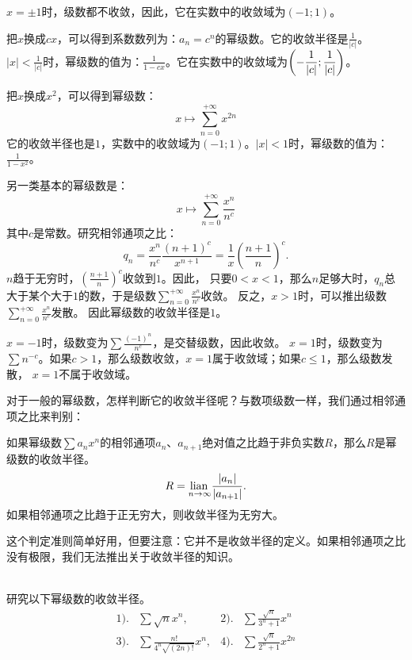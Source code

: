 \documentclass[12pt,UTF8,fontset=none]{ctexbook}
\begin{document}
$x = \pm 1$时，级数都不收敛，因此，它在实数中的收敛域为$(-1;1)$。

把$x$换成$cx$，可以得到系数数列为：$a_n = c^n$的幂级数。它的收敛半径是$\frac{1}{|c|}$。
$|x|<\frac{1}{|c|}$时，幂级数的值为：$\frac{1}{1 - cx}$。它在实数中的收敛域为$\displaystyle\left(-\frac{1}{|c|};\frac{1}{|c|}\right)$。

把$x$换成$x^2$，可以得到幂级数：
$$ x \mapsto \sum_{n=0}^{+\infty} x^{2n} $$
它的收敛半径也是$1$，实数中的收敛域为$(-1;1)$。$|x|<1$时，幂级数的值为：$\frac{1}{1 - x^2}$。

另一类基本的幂级数是：
$$ x \mapsto \sum_{n=0}^{+\infty} \frac{x^n}{n^c}$$
其中$c$是常数。研究相邻通项之比：
$$ q_n = \frac{x^n}{n^c} \frac{(n+1)^c}{x^{n+1}} = \frac{1}{x} \left(\frac{n+1}{n}\right)^c. $$
$n$趋于无穷时，$\displaystyle \left(\frac{n+1}{n}\right)^c$收敛到$1$。因此，
只要$0<x<1$，那么$n$足够大时，$q_n$总大于某个大于$1$的数，于是级数$\sum_{n=0}^{+\infty} \frac{x^n}{n^c}$收敛。
反之，$x>1$时，可以推出级数$\sum_{n=0}^{+\infty} \frac{x^n}{n^c}$发散。
因此幂级数的收敛半径是$1$。

$x=-1$时，级数变为$\sum \frac{(-1)^n}{n^c}$，是交替级数，因此收敛。
$x=1$时，级数变为$\sum n^{-c}$。如果$c>1$，那么级数收敛，$x=1$属于收敛域；如果$c\leqslant 1$，那么级数发散，
$x=1$不属于收敛域。

对于一般的幂级数，怎样判断它的收敛半径呢？与数项级数一样，我们通过相邻通项之比来判别：

\begin{tm}
    如果幂级数$\sum a_n x^n$的相邻通项$a_n$、$a_{n+1}$绝对值之比趋于非负实数$R$，那么$R$是幂级数的收敛半径。
    $$ R = \underset{n\to\infty}{\operatorname{lian}\,} \frac{|a_n|}{|a_{n+1}|}. $$
    如果相邻通项之比趋于正无穷大，则收敛半径为无穷大。
\end{tm}

这个判定准则简单好用，但要注意：它并不是收敛半径的定义。如果相邻通项之比没有极限，我们无法推出关于收敛半径的知识。

\begin{et}    
    \mbox{} \\
    研究以下幂级数的收敛半径。\\
    \begin{align*}
        1).& \sum \sqrt{n} x^n,  &2).& \sum \frac{\sqrt{n}}{3^n + 1} x^n \\
        3).& \sum \frac{n!}{4^n\sqrt{(2n)!}} x^n,  & 4).& \sum \frac{\sqrt{n}}{2^n+1} x^{2n} 
    \end{align*}
\end{et}
\end{document}
